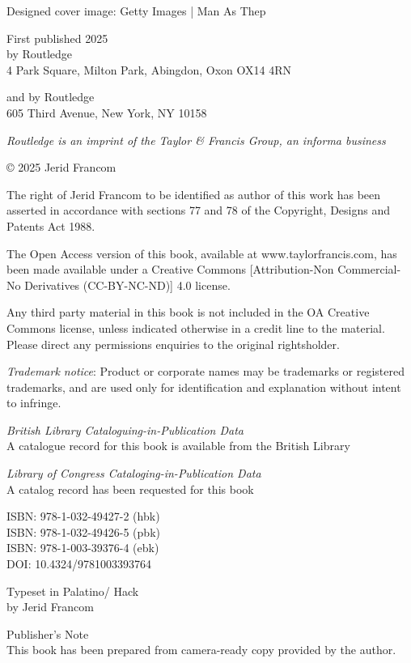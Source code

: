 


\pagebreak

Designed cover image: Getty Images | Man As Thep

First published 2025\\
by Routledge\\
4 Park Square, Milton Park, Abingdon, Oxon OX14 4RN

and by Routledge\\
605 Third Avenue, New York, NY 10158

\textit{Routledge is an imprint of the Taylor \& Francis Group, an informa business}

© 2025 Jerid Francom

The right of Jerid Francom to be identified as author of this work has been asserted in accordance with sections 77 and 78 of the Copyright, Designs and Patents Act 1988.

The Open Access version of this book, available at www.taylorfrancis.com, has been made available under a Creative Commons [Attribution-Non Commercial-No Derivatives (CC-BY-NC-ND)] 4.0 license.

Any third party material in this book is not included in the OA Creative Commons license, unless indicated otherwise in a credit line to the material. Please direct any permissions enquiries to the original rightsholder.

\textit{Trademark notice}: Product or corporate names may be trademarks or registered trademarks, and are used only for identification and explanation without intent to infringe.

\textit{British Library Cataloguing-in-Publication Data}\\
A catalogue record for this book is available from the British Library

\textit{Library of Congress Cataloging-in-Publication Data}\\
A catalog record has been requested for this book

ISBN: 978-1-032-49427-2 (hbk)\\
ISBN: 978-1-032-49426-5 (pbk)\\
ISBN: 978-1-003-39376-4 (ebk)\\

DOI: 10.4324/9781003393764

Typeset in Palatino/ Hack\\
by Jerid Francom\\

\vspace{.5cm}

Publisher's Note\\
This book has been prepared from camera-ready copy provided by the author.
